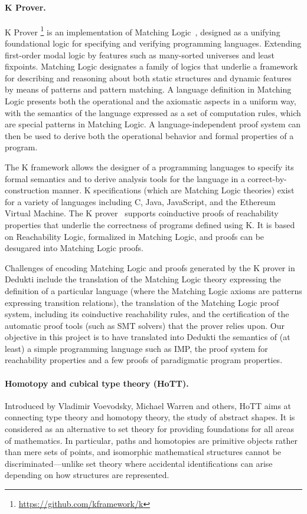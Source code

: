 \paragraph*{K Prover.}
K Prover \footnote{\url{https://github.com/kframework/k}} is an
implementation of Matching Logic~\cite{rosu:matching}, designed as a
unifying foundational logic for specifying and verifying programming
languages. Extending first-order modal logic by features such as
many-sorted universes and least fixpoints.  Matching Logic designates
a family of logics that underlie a framework for describing and
reasoning about both static structures and dynamic features by means
of patterns and pattern matching. A language definition in Matching
Logic presents both the operational and the axiomatic aspects in a
uniform way, with the semantics of the language expressed as a set of
computation rules, which are special patterns in Matching Logic. A
language-independent proof system can then be used to derive both the
operational behavior and formal properties of a program.

The K framework allows the designer of a programming languages to
specify its formal semantics and to derive analysis tools for the
language in a correct-by-construction manner. K specifications (which
are Matching Logic theories) exist for a variety of languages
including C, Java, JavaScript, and the Ethereum Virtual Machine. The K
prover~\cite{stefanescu:semantics} supports coinductive proofs of
reachability properties that underlie the correctness of programs
defined using K. It is based on Reachability Logic, formalized in
Matching Logic, and proofs can be desugared into Matching Logic
proofs.

Challenges of encoding Matching Logic and proofs generated by the K
prover in Dedukti include the translation of the Matching Logic theory
expressing the definition of a particular language (where the Matching
Logic axioms are patterns expressing transition relations), the
translation of the Matching Logic proof system, including its
coinductive reachability rules, and the certification of the automatic
proof tools (such as SMT solvers) that the prover relies upon. Our
objective in this project is to have translated into Dedukti the
semantics of (at least) a simple programming language such as IMP, the
proof system for reachability properties and a few proofs of
paradigmatic program properties.

\paragraph*{Homotopy and cubical type theory (HoTT).}
Introduced by Vladimir Voevodsky, Michael Warren and others, HoTT aims at
connecting type theory and homotopy theory, the study of abstract shapes. It is
considered as an alternative to set theory for providing foundations for all
areas of mathematics. In particular, paths and homotopies are primitive objects
rather than mere sets of points, and isomorphic mathematical structures cannot
be discriminated---unlike set theory where accidental identifications can arise
depending on how structures are represented.

